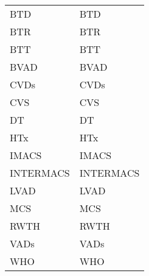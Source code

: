 \begin{tabularx}{\textwidth}{p{}X}
\acs{BTD} & \acl{BTD} \\
\acs{BTR} & \acl{BTR} \\
\acs{BTT} & \acl{BTT} \\
\acs{BVAD} & \acl{BVAD} \\
\acs{CVDs} & \acl{CVDs} \\
\acs{CVS} & \acl{CVS} \\
\acs{DT} & \acl{DT} \\
\acs{HTx} & \acl{HTx} \\
\acs{IMACS} & \acl{IMACS}\\
\acs{INTERMACS} & \acl{INTERMACS}\\
\acs{LVAD} & \acl{LVAD} \\
\acs{MCS} & \acl{MCS} \\
\acs{RWTH} & \acl{RWTH}\\
\acs{VADs} & \acl{VADs} \\
\acs{WHO} & \acl{WHO} \\
\end{tabularx}
%
%
%
%
%
%
%
%
